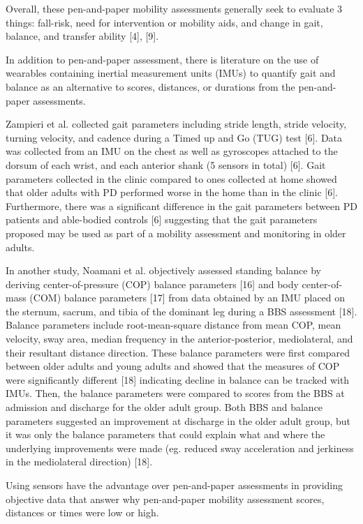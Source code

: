 Overall, these pen-and-paper mobility assessments generally seek to evaluate 3 things: fall-risk, 
need for intervention or mobility aids, and change in gait, balance, and transfer ability [4], [9].

In addition to pen-and-paper assessment, there is literature on the use of wearables containing 
inertial measurement units (IMUs) to quantify gait and balance as an alternative to scores, distances, 
or durations from the pen-and-paper assessments.

Zampieri et al. collected gait parameters including stride length, stride velocity, turning velocity, 
and cadence during a Timed up and Go (TUG) test [6]. Data was collected from an IMU on the chest as well 
as gyroscopes attached to the dorsum of each wrist, and each anterior shank (5 sensors in total) [6]. 
Gait parameters collected in the clinic compared to ones collected at home showed that older adults 
with PD performed worse in the home than in the clinic [6]. Furthermore, there was a significant 
difference in the gait parameters between PD patients and able-bodied controls [6] suggesting that 
the gait parameters proposed may be used as part of a mobility assessment and monitoring in older adults. 

In another study, Noamani et al. objectively assessed standing balance by deriving center-of-pressure 
(COP) balance parameters [16] and body center-of-mass (COM) balance parameters [17] from data obtained 
by an IMU placed on the sternum, sacrum, and tibia of the dominant leg during a BBS assessment [18]. 
Balance parameters include root-mean-square distance from mean COP, mean velocity, sway area, median 
frequency in the anterior-posterior, mediolateral, and their resultant distance direction. These balance 
parameters were first compared between older adults and young adults and showed that the measures of COP 
were significantly different [18] indicating decline in balance can be tracked with IMUs. Then, the 
balance parameters were compared to scores from the BBS at admission and discharge for the older adult group. 
Both BBS and balance parameters suggested an improvement at discharge in the older adult group, but it was 
only the balance parameters that could explain what and where the underlying improvements were made 
(eg. reduced sway acceleration and jerkiness in the mediolateral direction) [18]. 

Using sensors have the advantage over pen-and-paper assessments in providing objective data that answer 
why pen-and-paper mobility assessment scores, distances or times were low or high.

